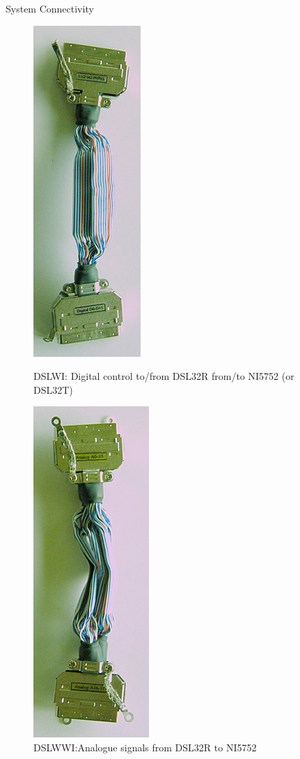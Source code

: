 \documentclass[t,12pt,english
\ifx\beamermode\undefined\else,\beamermode\fi
]{beamer}
\begin{document}
\begin{frame}{System Connectivity}

\begin{figure}[!htb]
\includegraphics[width=.33\textwidth, angle =90]{21.png}
\caption{\tiny{DSLWI: Digital control to/from DSL32R from/to NI5752 (or DSL32T)}}
\endminipage
{}
\centering
\includegraphics[width=.33\textwidth, angle =90 ]{22.png}
\caption{\tiny{DSLWWI:Analogue signals from DSL32R to NI5752}}
\endminipage
\end{figure}



\end{frame}
\end{document}
